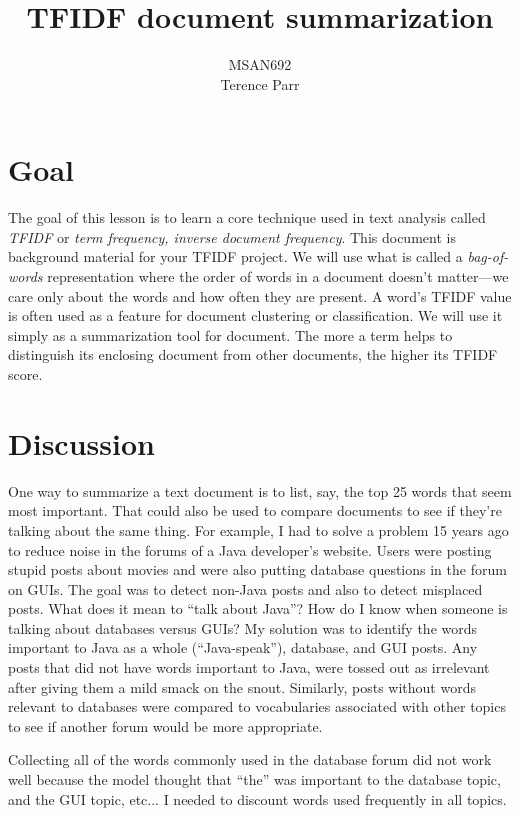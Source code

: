 \documentclass[10pt]{article}
\title{TFIDF document summarization}
\author{MSAN692\\Terence Parr}
\date{} %
\begin{document}
\maketitle

\setlength{\algomargin}{3pt}

\section{Goal}

The goal of this lesson is to learn a core technique used in text analysis called {\em TFIDF} or {\em term frequency, inverse document frequency}. This document is background material for your TFIDF project. We will use what is called a {\em bag-of-words} representation where the order of words in a document doesn't matter---we care only about the words and how often they are present. A word's TFIDF value is often used as a feature for document clustering or classification. We will use it simply as a summarization tool for document. The more a term helps to distinguish its enclosing document from other documents, the higher its TFIDF score. 

\section{Discussion}

One way to summarize a text document is to list, say, the top 25 words that seem most important. That could also be used to compare documents to see if they're talking about the same thing. For example, I had to solve a problem 15 years ago to reduce noise in the forums of a Java developer's website.  Users were posting stupid posts about movies and were also putting database questions in the forum on GUIs. The goal was to detect non-Java posts and also to detect misplaced posts. What does it mean to ``talk about Java''?  How do I know when someone is talking about databases versus GUIs? My solution was to identify the words important to Java as a whole (``Java-speak''), database, and GUI posts.  Any posts that did not have words important to Java, were tossed out as irrelevant after giving them a mild smack on the snout. Similarly, posts without words relevant to databases were compared to vocabularies associated with other topics to see if another forum would be more appropriate.  

Collecting all of the words commonly used in the database forum did not work well because the model  thought that ``the'' was important to the database topic, and the GUI topic, etc... I needed to discount words used frequently in all topics.
\end{document}
